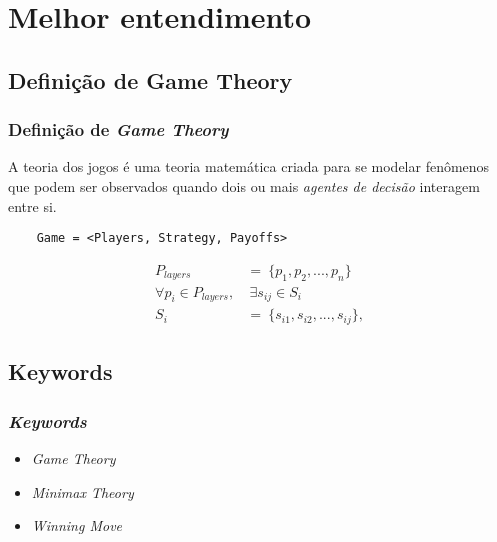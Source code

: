 
\section{Melhor entendimento}
\subsection{Definição de Game Theory}
\begin{frame}[fragile]
\frametitle{Definição de \textit{Game Theory}}
    A teoria dos jogos é uma teoria matemática criada para se modelar fenômenos que podem ser observados quando dois ou mais \textit{agentes de decisão} interagem entre si.
\begin{lstlisting}
    Game = <Players, Strategy, Payoffs>
\end{lstlisting}
\begin{equation*}
\begin{split}
  P_{layers}\ &=\ \{p_1, p_2,...,p_n\}\\
  \forall p_i \in P_{layers},&\ \exists s_{ij} \in S_i\\
  S_{i}\ &=\ \{s_{i1},s_{i2},...,s_{ij}\},
\end{split}
\end{equation*}
\end{frame}

\subsection{Keywords}
\begin{frame}
\frametitle{\textit{Keywords}}
\begin{itemize}
 \item \textit{Game Theory}
 \item \textit{Minimax Theory}
 \item \textit{Winning Move}
\end{itemize}
\end{frame}
